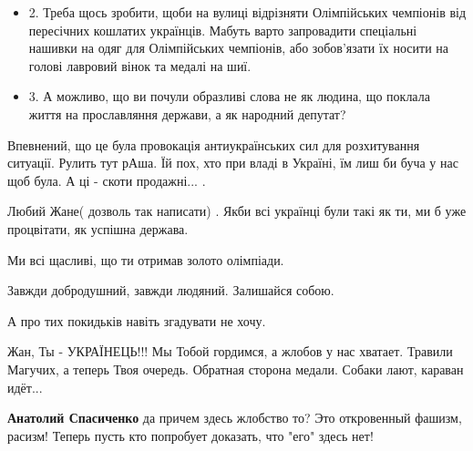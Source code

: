 \begin{itemize}
\begin{itemize}
\item 2. Треба щось зробити, щоби на вулиці відрізняти Олімпійських чемпіонів від
пересічних кошлатих українців. Мабуть варто запровадити спеціальні нашивки на
одяг для Олімпійських чемпіонів, або зобов'язати їх носити на голові лавровий
вінок та медалі на шиї.

\item 3. А можливо, що ви почули образливі слова не як людина, що поклала життя на
прославляння держави, а як народний депутат?
\end{itemize}

 

Впевнений, що це була провокація антиукраїнських сил для розхитування ситуації.
Рулить тут рАша. Їй пох, хто при владі в Україні, їм лиш би буча у нас щоб
була. А ці - скоти продажні... .


 

Любий Жане( дозволь так написати) . Якби всі українці були такі як ти, ми б уже
процвітати, як успішна держава.

Ми всі щасливі, що ти отримав золото олімпіади.

Завжди добродушний, завжди людяний. Залишайся собою.

А про тих покидьків навіть згадувати не хочу.


Жан, Ты - УКРАЇНЕЦЬ!!! Мы Тобой гордимся, а жлобов у нас хватает. Травили Магучих, а
теперь Твоя очередь. Обратная сторона медали. Собаки лают, караван идёт...

\begin{itemize}

 
\textbf{Анатолий Спасиченко} да причем здесь жлобство то? Это откровенный фашизм, расизм!
Теперь пусть кто попробует доказать, что "его" здесь нет! 
\end{itemize}


\end{itemize}
